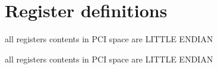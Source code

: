 \hypertarget{group__shared__vmeuniverse__reg}{}\section{Register definitions}
\label{group__shared__vmeuniverse__reg}


all registers contents in P\+CI space are L\+I\+T\+T\+LE E\+N\+D\+I\+AN  


all registers contents in P\+CI space are L\+I\+T\+T\+LE E\+N\+D\+I\+AN 

